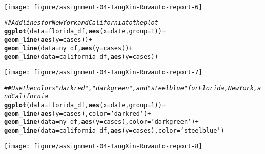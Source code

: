 \documentclass{article}\usepackage[]{graphicx}\usepackage[]{xcolor}
\makeatletter
\newcommand{\hlnum}[1]{\textcolor[rgb]{0.686,0.059,0.569}{#1}}%
\newcommand{\hlstr}[1]{\textcolor[rgb]{0.192,0.494,0.8}{#1}}%
\newcommand{\hlcom}[1]{\textcolor[rgb]{0.678,0.584,0.686}{\textit{#1}}}%
\newcommand{\hlopt}[1]{\textcolor[rgb]{0,0,0}{#1}}%
\newcommand{\hlstd}[1]{\textcolor[rgb]{0.345,0.345,0.345}{#1}}%
\newcommand{\hlkwc}[1]{\textcolor[rgb]{0.333,0.667,0.333}{#1}}%
\newcommand{\hlkwd}[1]{\textcolor[rgb]{0.737,0.353,0.396}{\textbf{#1}}}%
\newenvironment{kframe}{%
 \def\at@end@of@kframe{}%
 \ifinner\ifhmode%
  \def\at@end@of@kframe{\end{minipage}}%
  \begin{minipage}{\columnwidth}%
 \fi\fi%
 \def\FrameCommand##1{\hskip\@totalleftmargin \hskip-\fboxsep
 \colorbox{shadecolor}{##1}\hskip-\fboxsep
     \hskip-\linewidth \hskip-\@totalleftmargin \hskip\columnwidth}%
 \MakeFramed {\advance\hsize-\width
   \@totalleftmargin\z@ \linewidth\hsize
   \@setminipage}}%
 {\par\unskip\endMakeFramed%
 \at@end@of@kframe}
\newenvironment{knitrout}{}{} %
\makeatother
\begin{document}
\begin{knitrout}
{\centering \texttt{[image: figure/assignment-04-TangXin-Rnwauto-report-6]} 

}


\begin{kframe}\begin{alltt}
\hlcom{## Add lines for New York and California to the plot}
\hlkwd{ggplot}\hlstd{(}\hlkwc{data}\hlstd{=florida_df,} \hlkwd{aes}\hlstd{(}\hlkwc{x}\hlstd{=date,} \hlkwc{group}\hlstd{=}\hlnum{1}\hlstd{))} \hlopt{+}
  \hlkwd{geom_line}\hlstd{(}\hlkwd{aes}\hlstd{(}\hlkwc{y} \hlstd{= cases))} \hlopt{+}
  \hlkwd{geom_line}\hlstd{(}\hlkwc{data}\hlstd{=ny_df,} \hlkwd{aes}\hlstd{(}\hlkwc{y} \hlstd{= cases))} \hlopt{+}
  \hlkwd{geom_line}\hlstd{(}\hlkwc{data}\hlstd{=california_df,} \hlkwd{aes}\hlstd{(}\hlkwc{y} \hlstd{= cases))}
\end{alltt}
\end{kframe}

{\centering \texttt{[image: figure/assignment-04-TangXin-Rnwauto-report-7]} 

}


\begin{kframe}\begin{alltt}
\hlcom{## Use the colors "darkred", "darkgreen", and "steelblue" for Florida, New York, and California}
\hlkwd{ggplot}\hlstd{(}\hlkwc{data}\hlstd{=florida_df,} \hlkwd{aes}\hlstd{(}\hlkwc{x}\hlstd{=date,} \hlkwc{group}\hlstd{=}\hlnum{1}\hlstd{))} \hlopt{+}
  \hlkwd{geom_line}\hlstd{(}\hlkwd{aes}\hlstd{(}\hlkwc{y} \hlstd{= cases),} \hlkwc{color} \hlstd{=} \hlstr{'darkred'}\hlstd{)} \hlopt{+}
  \hlkwd{geom_line}\hlstd{(}\hlkwc{data}\hlstd{=ny_df,} \hlkwd{aes}\hlstd{(}\hlkwc{y} \hlstd{= cases),} \hlkwc{color}\hlstd{=}\hlstr{'darkgreen'}\hlstd{)} \hlopt{+}
  \hlkwd{geom_line}\hlstd{(}\hlkwc{data}\hlstd{=california_df,} \hlkwd{aes}\hlstd{(}\hlkwc{y} \hlstd{= cases),} \hlkwc{color}\hlstd{=}\hlstr{'steelblue'}\hlstd{)}
\end{alltt}
\end{kframe}

{\centering \texttt{[image: figure/assignment-04-TangXin-Rnwauto-report-8]} 

}



\end{knitrout}
\end{document}

